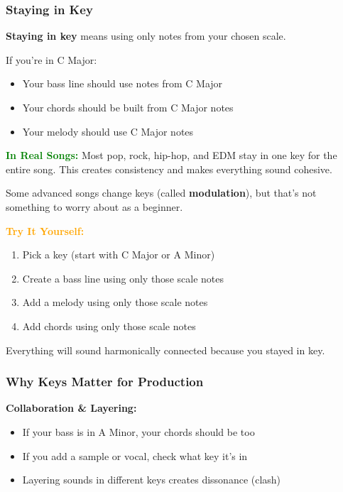 \documentclass[11pt,letterpaper]{article}
\newcommand{\greentext}[1]{\textcolor{green}{\textbf{#1}}}
\newcommand{\orangetext}[1]{\textcolor{orange}{\textbf{#1}}}
\begin{document}
\subsubsection{Staying in Key}

\textbf{Staying in key} means using only notes from your chosen scale.

If you're in C Major:
\begin{itemize}[leftmargin=*]
\item Your bass line should use notes from C Major
\item Your chords should be built from C Major notes
\item Your melody should use C Major notes
\end{itemize}

\textbf{\greentext{In Real Songs:}} Most pop, rock, hip-hop, and EDM stay in one key for the entire song. This creates consistency and makes everything sound cohesive.

Some advanced songs change keys (called \textbf{modulation}), but that's not something to worry about as a beginner.

\begin{tcolorbox}[colback=orange!10,colframe=orange,width=\textwidth,arc=3mm,boxrule=1pt]
\textbf{\orangetext{Try It Yourself:}}

\begin{enumerate}[leftmargin=*]
\item Pick a key (start with C Major or A Minor)
\item Create a bass line using only those scale notes
\item Add a melody using only those scale notes
\item Add chords using only those scale notes
\end{enumerate}

Everything will sound harmonically connected because you stayed in key.
\end{tcolorbox}

\subsubsection{Why Keys Matter for Production}

\textbf{Collaboration \& Layering:}
\begin{itemize}[leftmargin=*]
\item If your bass is in A Minor, your chords should be too
\item If you add a sample or vocal, check what key it's in
\item Layering sounds in different keys creates dissonance (clash)
\end{itemize}
\end{document}
